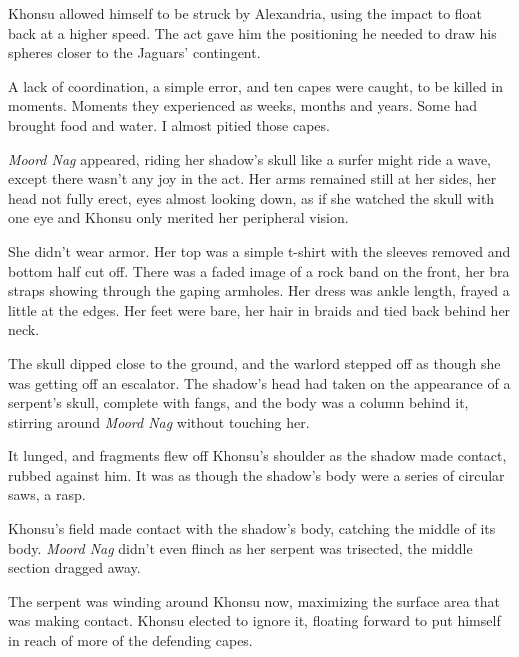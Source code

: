 





Khonsu allowed himself to be struck by Alexandria, using the impact to float back at a higher speed.  The act gave him the positioning he needed to draw his spheres closer to the Jaguars' contingent.



A lack of coordination, a simple error, and ten capes were caught, to be killed in moments.  Moments they experienced as weeks, months and years.  Some had brought food and water.  I almost pitied those capes.



\emph{Moord Nag }appeared, riding her shadow's skull like a surfer might ride a wave, except there wasn't any joy in the act.  Her arms remained still at her sides, her head not fully erect, eyes almost looking down, as if she watched the skull with one eye and Khonsu only merited her peripheral vision.



She didn't wear armor.  Her top was a simple t-shirt with the sleeves removed and bottom half cut off.  There was a faded image of a rock band on the front, her bra straps showing through the gaping armholes.  Her dress was ankle length, frayed a little at the edges.  Her feet were bare, her hair in braids and tied back behind her neck.



The skull dipped close to the ground, and the warlord stepped off as though she was getting off an escalator.  The shadow's head had taken on the appearance of a serpent's skull, complete with fangs, and the body was a column behind it, stirring around \emph{Moord Nag} without touching her.



It lunged, and fragments flew off Khonsu's shoulder as the  shadow made contact, rubbed against him.  It was as though the shadow's body were a series of circular saws, a rasp.



Khonsu's field made contact with the shadow's body, catching the middle of its body.  \emph{Moord Nag }didn't even flinch as her serpent was trisected, the middle section dragged away.



The serpent was winding around Khonsu now, maximizing the surface area that was making contact.  Khonsu elected to ignore it, floating forward to put himself in reach of more of the defending capes.



